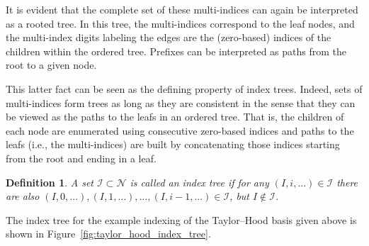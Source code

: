 \documentclass[a4paper,10pt,headings=normal,bibliography=totoc]{scrartcl}
\newtheorem{definition}{Definition}
\begin{document}
It is evident that the complete set of these multi-indices can again be interpreted as a rooted tree.
In this tree, the multi-indices correspond
to the leaf nodes, and the multi-index digits labeling the edges are the
(zero-based) indices of the children within the ordered tree.  Prefixes can be
interpreted as paths from the root to a given node.

This latter fact can be seen as the defining property of index trees.  Indeed,
sets of multi-indices form trees as long as they are consistent in the sense that they
can be viewed as the paths to the leafs in an ordered tree.
That is, the children of each node are enumerated using consecutive zero-based
indices and paths to the leafs (i.e., the multi-indices) are built by concatenating
those indices starting from the root and ending in a leaf.

\begin{definition}
 A set $\mathcal{I} \subset \mathcal{N}$ is called an \emph{index tree}
 if for any $(I,i,\dots) \in \mathcal{I}$ there are also $(I,0,\dots),(I,1,\dots),\dots,(I,i-1,\dots) \in \mathcal{I}$,
 but $I \notin \mathcal{I}$.
\end{definition}
The index tree for the example indexing of the Taylor--Hood basis given above is shown
in Figure~\ref{fig:taylor_hood_index_tree}.
\end{document}
